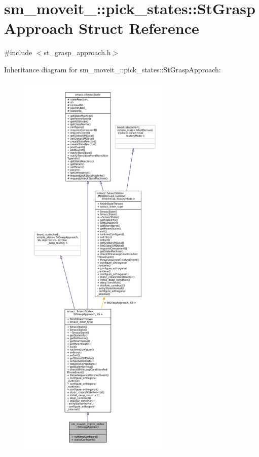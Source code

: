 \hypertarget{structsm__moveit__3_1_1pick__states_1_1StGraspApproach}{}\section{sm\+\_\+moveit\+\_\+:\+:pick\+\_\+states\+:\+:St\+Grasp\+Approach Struct Reference}
\label{structsm__moveit__3_1_1pick__states_1_1StGraspApproach}


{\ttfamily \#include $<$st\+\_\+grasp\+\_\+approach.\+h$>$}



Inheritance diagram for sm\+\_\+moveit\+\_\+:\+:pick\+\_\+states\+:\+:St\+Grasp\+Approach\+:
\nopagebreak
\begin{figure}[H]
\begin{center}
\leavevmode
\includegraphics[height=550pt]{structsm__moveit__3_1_1pick__states_1_1StGraspApproach__inherit__graph}
\end{center}
\end{figure}



